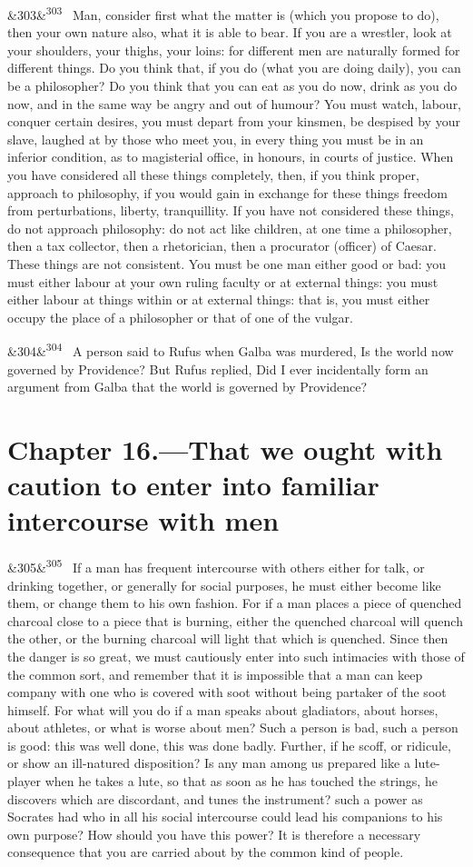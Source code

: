\documentclass[12pt]{article}
\newcommand{\para}[1][]{\par\noindent\ifx&#1&\else\textsuperscript{\footnotesize #1}~\fi}
\begin{document}
\para[303] Man, consider first what the matter is (which you propose to do), then your own nature also, what it is able to bear. If you are a wrestler, look at your shoulders, your thighs, your loins: for different men are naturally formed for different things. Do you think that, if you do (what you are doing daily), you can be a philosopher? Do you think that you can eat as you do now, drink as you do now, and in the same way be angry and out of humour? You must watch, labour, conquer certain desires, you must depart from your kinsmen, be despised by your slave, laughed at by those who meet you, in every thing you must be in an inferior condition, as to magisterial office, in honours, in courts of justice. When you have considered all these things completely, then, if you think proper, approach to philosophy, if you would gain in exchange for these things freedom from perturbations, liberty, tranquillity. If you have not considered these things, do not approach philosophy: do not act like children, at one time a philosopher, then a tax collector, then a rhetorician, then a procurator (officer) of Caesar. These things are not consistent. You must be one man either good or bad: you must either labour at your own ruling faculty or at external things: you must either labour at things within or at external things: that is, you must either occupy the place of a philosopher or that of one of the vulgar.

\para[304] A person said to Rufus when Galba was murdered, Is the world now governed by Providence? But Rufus replied, Did I ever incidentally form an argument from Galba that the world is governed by Providence?

\section*{Chapter 16.---That we ought with caution to enter into familiar intercourse with men}

\para[305] If a man has frequent intercourse with others either for talk, or drinking together, or generally for social purposes, he must either become like them, or change them to his own fashion. For if a man places a piece of quenched charcoal close to a piece that is burning, either the quenched charcoal will quench the other, or the burning charcoal will light that which is quenched. Since then the danger is so great, we must cautiously enter into such intimacies with those of the common sort, and remember that it is impossible that a man can keep company with one who is covered with soot without being partaker of the soot himself. For what will you do if a man speaks about gladiators, about horses, about athletes, or what is worse about men? Such a person is bad, such a person is good: this was well done, this was done badly. Further, if he scoff, or ridicule, or show an ill-natured disposition? Is any man among us prepared like a lute-player when he takes a lute, so that as soon as he has touched the strings, he discovers which are discordant, and tunes the instrument? such a power as Socrates had who in all his social intercourse could lead his companions to his own purpose? How should you have this power? It is therefore a necessary consequence that you are carried about by the common kind of people.
\end{document}

